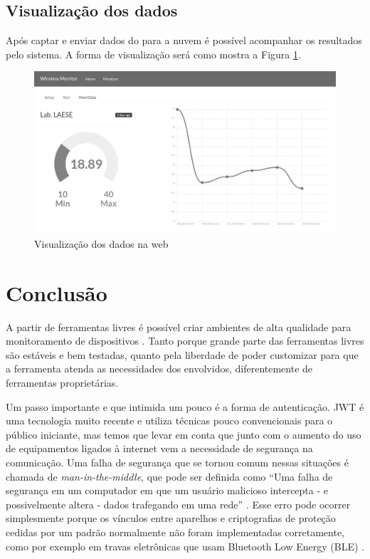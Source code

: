\subsection{Visualização dos dados}\label{visualizauxe7uxe3o-dos-dados}

Após captar e enviar dados do \iot para a nuvem é possível acompanhar os
resultados pelo sistema. A forma de visualização será como mostra a
Figura \ref{fig:view-monitor}.

\begin{figure}[h]
    \centering
    \includegraphics[scale=0.3]{img/temperature-show-grey.png}
    \caption{Visualização dos dados na web} \label{fig:view-monitor}
\end{figure}

\section{Conclusão}\label{conclusuxe3o}

A partir de ferramentas livres é possível criar ambientes de alta
qualidade para monitoramento de dispositivos \iot. Tanto porque grande
parte das ferramentas livres são estáveis e bem testadas, quanto pela
liberdade de poder customizar para que a ferramenta atenda as
necessidades dos envolvidos, diferentemente de ferramentas
proprietárias.

Um passo importante e que intimida um pouco é a forma de autenticação.
JWT é uma tecnologia muito recente e utiliza técnicas pouco
convencionais para o público iniciante, mas temos que levar em conta que
junto com o aumento do uso de equipamentos ligados à internet vem a
necessidade de segurança na comunicação. Uma falha de segurança que se
tornou comum nessas situações é chamada de \emph{man-in-the-middle}, que
pode ser definida como ``Uma falha de segurança em um computador em que
um usuário malicioso intercepta - e possivelmente altera - dados
trafegando em uma rede'' \cite{wordspy:2002}. Esse erro pode ocorrer
simplesmente porque os vínculos entre aparelhos e criptografias de
proteção cedidas por um padrão normalmente não foram implementadas
corretamente, como por exemplo em travas eletrônicas que usam Bluetooth
Low Energy (BLE) \cite{spring:2016}.

